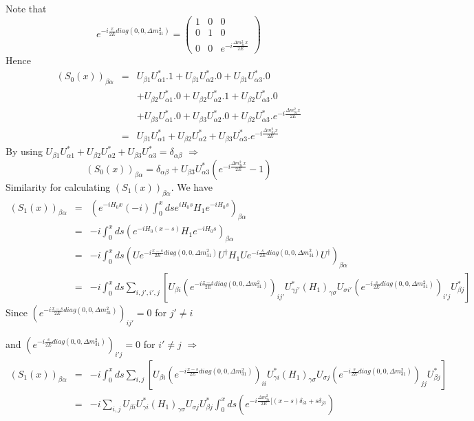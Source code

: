 \documentclass[a4 paper,12pt]{report}%
\begin{document}
Note that 
$$e^{-i\frac{x}{2E}diag(0,0,\Delta m^2_{31})} = \left(\begin{array}{ccc} 1&0&0\\0&1&0\\ 0&0&e^{-i\frac{\Delta m^2_{31}x}{2E}}\end{array}\right)$$
Hence
 \begin{eqnarray}\nonumber
(S_0(x))_{\beta\alpha} &=&U_{\beta 1}U^*_{\alpha 1}.1 + U_{\beta 1}U^*_{\alpha 2}.0+U_{\beta 1}U^*_{\alpha 3}.0\\ \nonumber
&&+ U_{\beta 2}U^*_{\alpha 1}.0 + U_{\beta 2}U^*_{\alpha 2}.1+U_{\beta 2}U^*_{\alpha 3}.0\\ \nonumber
&&+ U_{\beta 3}U^*_{\alpha 1}.0 + U_{\beta 3}U^*_{\alpha 2}.0+U_{\beta 2}U^*_{\alpha 3}.e^{-i\frac{\Delta m^2_{31}x}{2E}}\\ \nonumber
&=&U_{\beta 1}U^*_{\alpha 1} + U_{\beta 2}U^*_{\alpha 2}+U_{\beta 3}U^*_{\alpha 3}.e^{-i\frac{\Delta m^2_{31}x}{2E}}
\end{eqnarray}
By using $U_{\beta 1}U^*_{\alpha 1} + U_{\beta 2}U^*_{\alpha 2}+U_{\beta 3}U^*_{\alpha 3} = \delta_{\alpha\beta}$ \quad$\Rightarrow$ 
\begin{equation}\label{65}
(S_0(x))_{\beta\alpha}=\delta_{\alpha\beta} + U_{\beta 3}U^*_{\alpha 3}\left(e^{-i\frac{\Delta m^2_{31}x}{2E}} - 1\right)
\end{equation}
Similarity for calculating $(S_1(x))_{\beta\alpha}$. We have
 \begin{eqnarray}\nonumber
(S_1(x))_{\beta\alpha} &=& \left(e^{-iH_0x}(-i)\int^x_0dse^{iH_0s}H_1e^{-iH_0 s}\right)_{\beta\alpha}\\ \nonumber
&=& -i \int^x_0ds\left(e^{-iH_0(x-s)}H_1e^{-iH_0s}\right)_{\beta\alpha}\\ \nonumber
&=& -i  \int^x_0ds\left(Ue^{-i\frac{x-s}{2E}diag(0,0,\Delta m^2_{31})}U^\dagger H_1Ue^{-i\frac{s}{2E}diag(0,0,\Delta m^2_{31})}U^\dagger\right)_{\beta\alpha}\\ \nonumber
&=& -i  \int^x_0ds\sum_{i,j',i',j}\left[U_{\beta i}\left(e^{-i\frac{x-s}{2E}diag(0,0,\Delta m^2_{31})}\right)_{ij'}U^*_{\gamma j'} (H_1)_{\gamma \sigma}U_{\sigma i'}\left(e^{-i\frac{s}{2E}diag(0,0,\Delta m^2_{31})}\right)_{i'j}U^*_{\beta j}\right]
\end{eqnarray}
Since $\left(e^{-i\frac{x-s}{2E}diag(0,0,\Delta m^2_{31})}\right)_{ij'} = 0$ for $j' \not= i$\par
and $\left(e^{-i\frac{s}{2E}diag(0,0,\Delta m^2_{31})}\right)_{i'j} = 0$ for $i' \not= j$ \quad $\Rightarrow$
 \begin{eqnarray}\nonumber
(S_1(x))_{\beta\alpha} &=& -i  \int^x_0ds\sum_{i,j}\left[U_{\beta i}\left(e^{-i\frac{x-s}{2E}diag(0,0,\Delta m^2_{31})}\right)_{ii}U^*_{\gamma i} (H_1)_{\gamma \sigma}U_{\sigma j}\left(e^{-i\frac{s}{2E}diag(0,0,\Delta m^2_{31})}\right)_{jj}U^*_{\beta j}\right]\\ 
&=&-i \sum_{i,j}U_{\beta i}U^*_{\gamma i} (H_1)_{\gamma \sigma}U_{\sigma j}U^*_{\beta j} \int^x_0ds\left(e^{-i\frac{\Delta m^2_{31}}{2E}[(x-s)\delta_{i3}+ s\delta_{j3}}\right)
\end{eqnarray}
\end{document}
